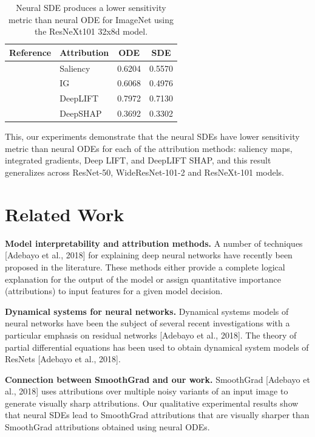 \documentclass[10pt,twocolumn]{article}
\begin{document}
\begin{table}[h!]
\centering
\caption{Neural SDE produces a lower sensitivity metric than neural ODE for ImageNet using the ResNeXt101 32x8d model.}
\begin{tabular}{p{4cm}lcc}
\toprule
Reference & Attribution & ODE & SDE \\
\midrule
\cite{adebayo2018sanity} & Saliency & 0.6204 & 0.5570 \\
\cite{adebayo2018sanity} & IG & 0.6068 & 0.4976 \\
\cite{adebayo2018sanity} & DeepLIFT & 0.7972 & 0.7130 \\
\cite{adebayo2018sanity} & DeepSHAP & 0.3692 & 0.3302 \\
\bottomrule
\end{tabular}
\label{tab:resnext}
\end{table}

This, our experiments demonstrate that the neural SDEs have lower sensitivity metric than neural ODEs for each of the attribution methods: saliency maps, integrated gradients, Deep LIFT, and DeepLIFT SHAP, and this result generalizes across ResNet-50, WideResNet-101-2 and ResNeXt-101 models.

\section{Related Work}

\textbf{Model interpretability and attribution methods.} A number of techniques [Adebayo et al., 2018] for explaining deep neural networks have recently been proposed in the literature. These methods either provide a complete logical explanation for the output of the model or assign quantitative importance (attributions) to input features for a given model decision.

\textbf{Dynamical systems for neural networks.} Dynamical systems models of neural networks have been the subject of several recent investigations with a particular emphasis on residual networks [Adebayo et al., 2018]. The theory of partial differential equations has been used to obtain dynamical system models of ResNets [Adebayo et al., 2018].

\textbf{Connection between SmoothGrad and our work.} SmoothGrad [Adebayo et al., 2018] uses attributions over multiple noisy variants of an input image to generate visually sharp attributions. Our qualitative experimental results show that neural SDEs lead to SmoothGrad attributions that are visually sharper than SmoothGrad attributions obtained using neural ODEs.
\end{document}
